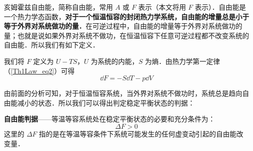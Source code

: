 

亥姆霍兹自由能，简称自由能，常用 $A$ 或 $F$ 表示（本文将用 $F$ 表示）．自由能是一个热力学态函数，\textbf{对于一个恒温恒容的封闭热力学系统，自由能的增量总是小于等于外界对系统做功的量．}在可逆过程中，自由能的增量等于外界对系统做功的量；也就是说如果外界对系统不做功，在恒温恒容下任意可逆过程都不改变系统的自由能．所以我们有如下定义．

我们将 $F$ 定义为 $U-TS$，$U$ 为系统的内能，$S$ 为熵．由热力学第一定律（\autoref{Th1Law_eq2}）可得
\begin{equation}
\dd F=-S\dd T-p\dd V
\end{equation}

由前面的分析可知，对于恒温恒容系统，当外界对系统不做功时，系统总是趋向自由能减小的状态．所以我们可以得出判定稳定平衡状态的判据：

\textbf{自由能判据}——等温等容系统处在稳定平衡状态的必要和充分条件为：
\begin{equation}
\Delta F>0
\end{equation}
这里的 $\Delta F$ 指的是在等温等容条件下系统可能发生的任何虚变动引起的自由能改变量．